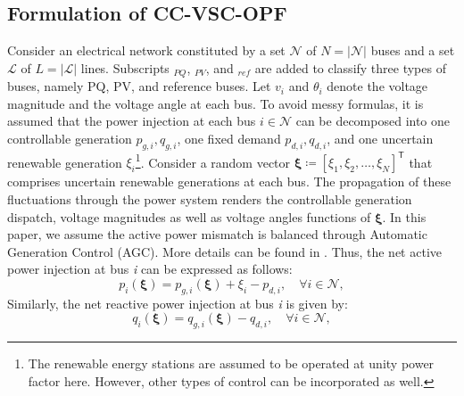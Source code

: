 \documentclass[journal]{IEEEtran}
\theoremstyle{definition}
\theoremstyle{remark}
\begin{document}
\subsection{Formulation of CC-VSC-OPF}
Consider an electrical network constituted by a set \(\mathcal{N}\) of \(N=\left|\mathcal{N}\right|\) buses and a set \(\mathcal{L}\) of \(L=\left|\mathcal{L}\right|\) lines. Subscripts $_{PQ}$, $_{PV}$, and $_{ref}$ are added to classify three types of buses, namely PQ, PV, and reference buses. Let $v_i$ and $\theta_i$ denote the voltage magnitude and the voltage angle at each bus. To avoid messy formulas, it is assumed that the power injection at each bus $i\in\mathcal{N}$ can be decomposed into one controllable generation $p_{g,i},q_{g,i}$, one fixed demand $p_{d,i},q_{d,i}$, and one uncertain renewable generation $\xi_{i}$\footnote{The renewable energy stations are assumed to be operated at unity power factor here. However, other types of control can be incorporated as well.}. Consider a random vector $\boldsymbol{\xi}\coloneqq[\xi_1,\xi_2,\dots,\xi_N]^{\mathsf{T}}$ that comprises uncertain renewable generations at each bus. The propagation of these fluctuations through the power system renders the controllable generation dispatch, voltage magnitudes as well as voltage angles functions of $\boldsymbol{\xi}$. In this paper, we assume the active power mismatch is balanced through Automatic Generation Control (AGC). More details can be found in \cite{roald2018chance}. Thus, the net active power injection at bus \textit{i} can be expressed as follows:
\begin{equation}\label{eq:1}
    p_i(\boldsymbol{\xi})=p_{g,i}(\boldsymbol{\xi})+\xi_{i}-p_{d,i},\quad \forall i \in \mathcal{N},
\end{equation}
Similarly, the net reactive power injection at bus \textit{i} is given by:
\begin{equation}\label{eq:2}
    q_i(\boldsymbol{\xi})=q_{g,i}(\boldsymbol{\xi})-q_{d,i},\quad \forall i \in \mathcal{N},
\end{equation}
\end{document}
